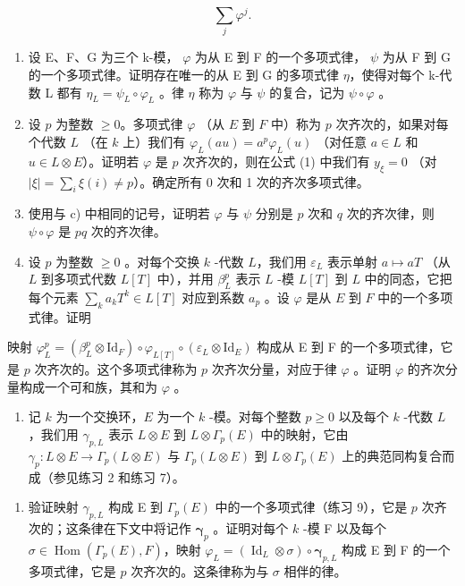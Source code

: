 \[
\sum_ {j} \varphi^ {j}.
\]

\begin{enumerate}
\def\labelenumi{\alph{enumi})}
\setcounter{enumi}{2}
\item
  设 E、F、G 为三个 k-模， \(\varphi\) 为从 E 到 F 的一个多项式律， \(\psi\) 为从 F 到 G 的一个多项式律。证明存在唯一的从 E 到 G 的多项式律 \(\eta\)，使得对每个 k-代数 L 都有 \(\eta_{L} = \psi_{L} \circ \varphi_{L}\) 。律 \(\eta\) 称为 \(\varphi\) 与 \(\psi\) 的复合，记为 \(\psi \circ \varphi\) 。
\item
  设 \(p\) 为整数 \(\geqslant 0\)。多项式律 \(\varphi\) （从 \(E\) 到 \(F\) 中）称为 \(p\) 次齐次的，如果对每个代数 \(L\) （在 \(k\) 上）我们有 \(\varphi_{L}(au) = a^{p}\varphi_{L}(u)\) （对任意 \(a \in L\) 和 \(u \in L \otimes E\)）。证明若 \(\varphi\) 是 \(p\) 次齐次的，则在公式 (1) 中我们有 \(y_{\xi} = 0\) （对 \(|\xi| = \sum_{i} \xi(i) \neq p\)）。确定所有 0 次和 1 次的齐次多项式律。
\item
  使用与 c) 中相同的记号，证明若 \(\varphi\) 与 \(\psi\) 分别是 \(p\) 次和 \(q\) 次的齐次律，则 \(\psi \circ \varphi\) 是 \(pq\) 次的齐次律。
\item
  设 \(p\) 为整数 \(\geqslant 0\) 。对每个交换 \(k\) -代数 \(L\)，我们用 \(\varepsilon_L\) 表示单射 \(a \mapsto aT\) （从 \(L\) 到多项式代数 \(L[T]\) 中），并用 \(\beta_L^p\) 表示 \(L\) -模 \(L[T]\) 到 \(L\) 中的同态，它把每个元素 \(\sum_k a_k T^k \in L[T]\) 对应到系数 \(a_p\) 。设 \(\varphi\) 是从 \(E\) 到 \(F\) 中的一个多项式律。证明
\end{enumerate}

映射 \(\varphi_{L}^{p} = (\beta_{L}^{p}\otimes \mathrm{Id}_{F})\circ \varphi_{L[T]}\circ (\varepsilon_{L}\otimes \mathrm{Id}_{E})\) 构成从 E 到 F 的一个多项式律，它是 \(p\) 次齐次的。这个多项式律称为 \(p\) 次齐次分量，对应于律 \(\varphi\) 。证明 \(\varphi\) 的齐次分量构成一个可和族，其和为 \(\varphi\) 。

\begin{enumerate}
\def\labelenumi{\arabic{enumi})}
\setcounter{enumi}{9}
\tightlist
\item
  记 \(k\) 为一个交换环，\(E\) 为一个 \(k\) -模。对每个整数 \(p \geqslant 0\) 以及每个 \(k\) -代数 \(L\)，我们用 \(\gamma_{p,L}\) 表示 \(L \otimes E\) 到 \(L \otimes \Gamma_p(E)\) 中的映射，它由 \(\gamma_p: L \otimes E \to \Gamma_p(L \otimes E)\) 与 \(\Gamma_p(L \otimes E)\) 到 \(L \otimes \Gamma_p(E)\) 上的典范同构复合而成（参见练习 2 和练习 7）。
\end{enumerate}

\begin{enumerate}
\def\labelenumi{\alph{enumi})}
\tightlist
\item
  验证映射 \(\gamma_{p,L}\) 构成 E 到 \(\Gamma_p(E)\) 中的一个多项式律（练习 9），它是 \(p\) 次齐次的；这条律在下文中将记作 \(\boldsymbol{\gamma}_p\) 。证明对每个 \(k\) -模 F 以及每个 \(\sigma \in \operatorname{Hom}(\Gamma_p(E), F)\)，映射 \(\varphi_L = (\operatorname{Id}_L \otimes \sigma) \circ \boldsymbol{\gamma}_{p,L}\) 构成 E 到 F 的一个多项式律，它是 \(p\) 次齐次的。这条律称为与 \(\sigma\) 相伴的律。
\end{enumerate}

